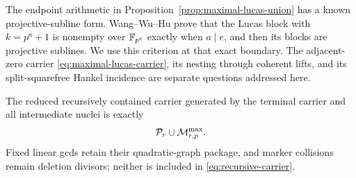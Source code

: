 The endpoint arithmetic in Proposition~\ref{prop:maximal-lucas-union} has a
known projective-subline form.  Wang--Wu--Hu
\cite[Prop.~11]{WangWuHu2026} prove that the Lucas block with
\(k=p^a+1\) is nonempty over \(\mathbb F_{p^e}\) exactly when \(a\mid e\), and
then its blocks are projective sublines.  We use this criterion at that
exact boundary.  The adjacent-zero carrier
\eqref{eq:maximal-lucas-carrier}, its nesting through coherent lifts, and
its split-squarefree Hankel incidence are separate questions addressed here.

\begin{proposition}
\label{prop:recursive-component-selection}%
%
The reduced recursively contained carrier generated by the terminal carrier
and all intermediate nuclei is exactly
\begin{equation}\label{eq:recursive-carrier}
                       \mathcal P_r\cup\mathcal M^{\max}_{r,p}.
\end{equation}
Fixed linear gcds retain their quadratic-graph package, and marker collisions
remain deletion divisors; neither is included in
\eqref{eq:recursive-carrier}.
\end{proposition}

